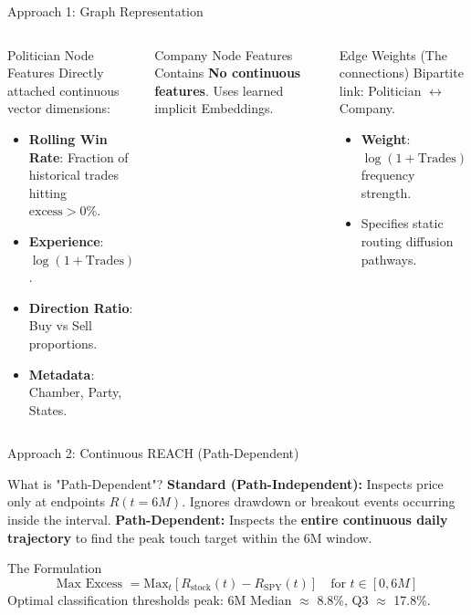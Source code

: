 \documentclass[aspectratio=169,11pt]{beamer}
\begin{document}
\begin{frame}{Approach 1: Graph Representation}

  \begin{columns}[T]
      \begin{block}{Politician Node Features}
        \footnotesize
        Directly attached continuous vector dimensions:
        \begin{itemize}
          \item \textbf{Rolling Win Rate}: Fraction of historical trades hitting $\text{excess} > 0\%$.
          \item \textbf{Experience}: $\log(1 + \text{Trades})$.
          \item \textbf{Direction Ratio}: Buy vs Sell proportions.
          \item \textbf{Metadata}: Chamber, Party, States.
        \end{itemize}
      \end{block}

      \begin{block}{Company Node Features}
        \footnotesize
        Contains \textbf{No continuous features}.
        Uses learned implicit Embeddings.
      \end{block}

      \begin{block}{Edge Weights (The connections)}
        \footnotesize
        Bipartite link: Politician $\leftrightarrow$ Company.
        \begin{itemize}
          \item \textbf{Weight}: $\log(1 + \text{Trades})$ frequency strength.
          \item Specifies static routing diffusion pathways.
        \end{itemize}
      \end{block}
  \end{columns}

\end{frame}

\begin{frame}{Approach 2: Continuous REACH (Path-Dependent)}

  \begin{block}{What is "Path-Dependent"?}
    \small
    \textbf{Standard (Path-Independent):} Inspects price only at endpoints $R(t=6M)$. Ignores drawdown or breakout events occurring inside the interval.
    \textbf{Path-Dependent:} Inspects the \textbf{entire continuous daily trajectory} to find the peak touch target within the 6M window.
  \end{block}

  \begin{block}{The Formulation}
    \[ \text{Max Excess } = \text{Max}_t [R_{\text{stock}}(t) - R_{\text{SPY}}(t)] \quad \text{for } t \in [0, 6M] \]
    Optimal classification thresholds peak: 6M Median $\approx$ 8.8\%, Q3 $\approx$ 17.8\%.
  \end{block}

\end{frame}
\end{document}
